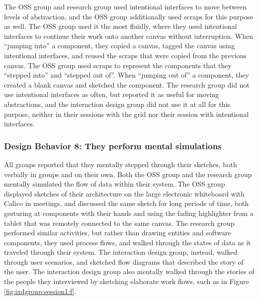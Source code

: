\documentclass[12pt,fleqn]{ucithesis}
\begin{document}
The OSS group and research group used intentional interfaces to move between levels of abstraction, and the OSS group additionally used scraps for this purpose as well. The OSS group used it the most fluidly, where they used intentional interfaces to continue their work onto another canvas without interruption. When ``jumping into'' a component, they copied a canvas, tagged the canvas using intentional interfaces, and reused the scraps that were copied from the previous canvas.  The OSS group used scraps to represent the components that they ``stepped into'' and ``stepped out of''. When ``jumping out of'' a component, they created a blank canvas and sketched the component. The research group did not use intentional interfaces as often, but reported it as useful for moving abstractions, and the interaction design group did not use it at all for this purpose, neither in their sessions with the grid nor their session with intentional interfaces.


\subsubsection{Design Behavior 8: They perform mental simulations}

All groups reported that they mentally stepped through their sketches, both verbally in groups and on their own. Both the OSS group and the research group mentally simulated the flow of data within their system. The OSS group displayed sketches of their architecture on the large electronic whiteboard with Calico in meetings, and discussed the same sketch for long periods of time, both gesturing at components with their hands and using the fading highlighter from a tablet that was remotely connected to the same canvas. The research group performed similar activities, but rather than drawing entities and software components, they used process flows, and walked through the states of data as it traveled through their system. The interaction design group, instead, walked through user scenarios, and sketched flow diagrams that described the story of the user. The interaction design group also mentally walked through the stories of the people they interviewed by sketching elaborate work flows, such as in Figure \ref{fig:ixdgroup:session1:f}.
\end{document}
